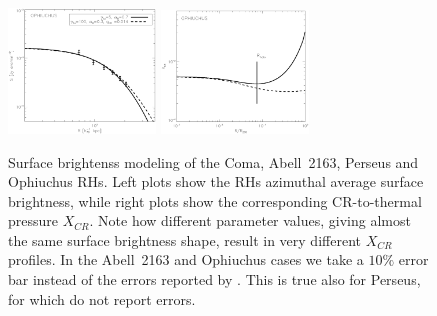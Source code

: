 \documentclass[traditabstract]{aa}
\begin{document}
\begin{figure}[hbt!]
\includegraphics[width=0.35\textwidth]{figures/SB_profiles_Ophiuchus_PAPER.eps}
\includegraphics[width=0.35\textwidth]{figures/XCR_profiles_Ophiuchus_PAPER.eps}
\caption{Surface brightenss modeling of the Coma, Abell~2163, Perseus and Ophiuchus RHs. Left plots show the RHs azimuthal average surface brightness, while right plots show the corresponding CR-to-thermal pressure $X_{CR}$. Note how different parameter values, giving almost the same surface brightness shape, result in very different $X_{CR}$ profiles.
In the Abell~2163 and Ophiuchus cases we take a $10\%$ error bar instead of the errors reported by \cite{2009A&A...499..679M}. This is true also for Perseus, for which \cite{1990MNRAS.246..477P} do not report errors.}
\label{fig:SBmodeling}
\end{figure}
\end{document}
